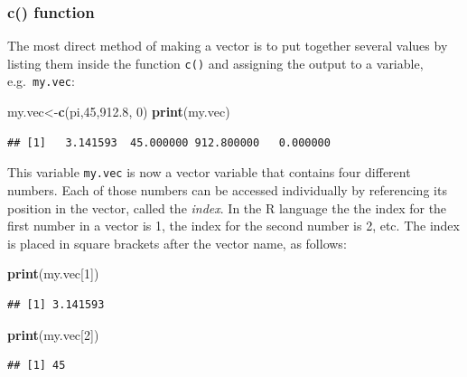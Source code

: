 \documentclass[
]{book}
\newenvironment{Shaded}{\begin{snugshade}}{\end{snugshade}}
\newcommand{\DecValTok}[1]{\textcolor[rgb]{0.00,0.00,0.81}{#1}}
\newcommand{\FloatTok}[1]{\textcolor[rgb]{0.00,0.00,0.81}{#1}}
\newcommand{\KeywordTok}[1]{\textcolor[rgb]{0.13,0.29,0.53}{\textbf{#1}}}
\newcommand{\NormalTok}[1]{#1}
\theoremstyle{definition}
\theoremstyle{definition}
\theoremstyle{definition}
\theoremstyle{remark}
\begin{document}
\hypertarget{c-function}{%
\subsubsection{c() function}\label{c-function}}

The most direct method of making a vector is to put together several values by listing them inside the function \texttt{c()} and assigning the output to a variable, e.g.~\texttt{my.vec}:

\begin{Shaded}
\begin{Highlighting}[]
\NormalTok{my.vec\textless{}{-}}\KeywordTok{c}\NormalTok{(pi,}\DecValTok{45}\NormalTok{,}\FloatTok{912.8}\NormalTok{, }\DecValTok{0}\NormalTok{)}
\KeywordTok{print}\NormalTok{(my.vec)}
\end{Highlighting}
\end{Shaded}

\begin{verbatim}
## [1]   3.141593  45.000000 912.800000   0.000000
\end{verbatim}

This variable \texttt{my.vec} is now a vector variable that contains four different numbers. Each of those numbers can be accessed individually by referencing its position in the vector, called the  \emph{index}. In the R language the the index for the first number in a vector is 1, the index for the second number is 2, etc. The index is placed in square brackets after the vector name, as follows:

\begin{Shaded}
\begin{Highlighting}[]
\KeywordTok{print}\NormalTok{(my.vec[}\DecValTok{1}\NormalTok{])}
\end{Highlighting}
\end{Shaded}

\begin{verbatim}
## [1] 3.141593
\end{verbatim}

\begin{Shaded}
\begin{Highlighting}[]
\KeywordTok{print}\NormalTok{(my.vec[}\DecValTok{2}\NormalTok{])}
\end{Highlighting}
\end{Shaded}

\begin{verbatim}
## [1] 45
\end{verbatim}
\end{document}
